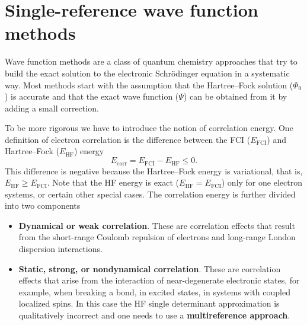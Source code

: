 \documentclass[../Main/chem532-notes.tex]{subfiles}
\begin{document}
\setcounter{chapter}{7}

\chapter{Single-reference wave function methods}

Wave function methods are a class of quantum chemistry approaches that try to build the exact solution to the electronic Schr\"{o}dinger equation in a systematic way.
Most methods start with the assumption that the Hartree--Fock solution ($\Phi_0$) is accurate and that  the exact wave function ($\Psi$) can be obtained from it by adding a small correction.

To be more rigorous we have to introduce the notion of correlation energy. One definition of electron correlation is the difference between the FCI ($E_{\mathrm{FCI}}$)  and Hartree--Fock ($E_{\mathrm{HF}}$) energy
\begin{equation}
E_{\mathrm{corr}} = E_{\mathrm{FCI}} - E_{\mathrm{HF}} \leq 0.
\end{equation}
This difference is negative because the Hartree--Fock energy is variational, that is, $E_{\mathrm{HF}} \geq E_{\mathrm{FCI}}$. Note that the HF energy is exact ($E_{\mathrm{HF}} = E_{\mathrm{FCI}}$) only for one electron systems, or certain other special cases.
The correlation energy is further divided into two components
\begin{itemize}
\item \textbf{Dynamical or weak correlation}. These are correlation effects that result from the short-range Coulomb repulsion of electrons and long-range London dispersion interactions.
\item \textbf{Static, strong, or nondynamical correlation}. These are correlation effects that arise from the interaction of near-degenerate electronic states, for example, when breaking a bond, in excited states, in systems with coupled localized spins. In this case the HF single determinant approximation is qualitatively incorrect and one needs to use a \textbf{multireference approach}.
\end{itemize}
\end{document}
